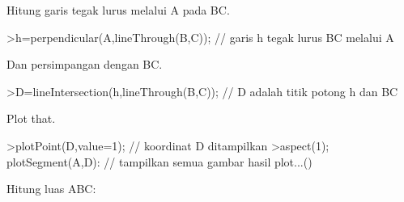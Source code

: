 \documentclass[a4paper,10pt]{article}
\begin{document}
\begin{eulernotebook}
\begin{eulercomment}
\begin{eulercomment}
\begin{eulercomment}
\begin{eulercomment}
\begin{eulercomment}
\begin{eulercomment}
\begin{eulercomment}
\begin{eulercomment}
\begin{eulercomment}
\begin{eulercomment}
\begin{eulercomment}
\begin{eulercomment}
\begin{eulercomment}
\begin{eulercomment}
\begin{eulercomment}
\begin{eulercomment}
\begin{eulercomment}
\begin{eulercomment}
\begin{eulercomment}
\begin{eulercomment}
\begin{eulercomment}
\begin{eulercomment}
\begin{eulercomment}
\begin{eulercomment}
\begin{eulercomment}
\begin{eulercomment}
\begin{eulercomment}
\begin{eulercomment}
\begin{eulercomment}
\begin{eulercomment}
\begin{eulercomment}
\begin{eulercomment}
\begin{eulercomment}
\begin{eulercomment}
\begin{eulercomment}
\begin{eulercomment}
\begin{eulercomment}
\begin{eulercomment}
\begin{eulerprompt}
\end{eulerprompt}
\begin{euleroutput}
  [-1,  2,  2]
\end{euleroutput}
\begin{eulercomment}
Hitung garis tegak lurus melalui A pada BC.
\end{eulercomment}
\begin{eulerprompt}
>h=perpendicular(A,lineThrough(B,C)); // garis h tegak lurus BC melalui A
\end{eulerprompt}
\begin{eulercomment}
Dan persimpangan dengan BC.
\end{eulercomment}
\begin{eulerprompt}
>D=lineIntersection(h,lineThrough(B,C)); // D adalah titik potong h dan BC
\end{eulerprompt}
\begin{eulercomment}
Plot that.
\end{eulercomment}
\begin{eulerprompt}
>plotPoint(D,value=1); // koordinat D ditampilkan
>aspect(1); plotSegment(A,D): // tampilkan semua gambar hasil plot...()
\end{eulerprompt}
\begin{eulercomment}
Hitung luas ABC:


\end{eulercomment}
\end{eulercomment}
\end{eulercomment}
\end{eulercomment}
\end{eulercomment}
\end{eulercomment}
\end{eulercomment}
\end{eulercomment}
\end{eulercomment}
\end{eulercomment}
\end{eulercomment}
\end{eulercomment}
\end{eulercomment}
\end{eulercomment}
\end{eulercomment}
\end{eulercomment}
\end{eulercomment}
\end{eulercomment}
\end{eulercomment}
\end{eulercomment}
\end{eulercomment}
\end{eulercomment}
\end{eulercomment}
\end{eulercomment}
\end{eulercomment}
\end{eulercomment}
\end{eulercomment}
\end{eulercomment}
\end{eulercomment}
\end{eulercomment}
\end{eulercomment}
\end{eulercomment}
\end{eulercomment}
\end{eulercomment}
\end{eulercomment}
\end{eulercomment}
\end{eulercomment}
\end{eulercomment}
\end{eulercomment}
\end{eulernotebook}
\end{document}
